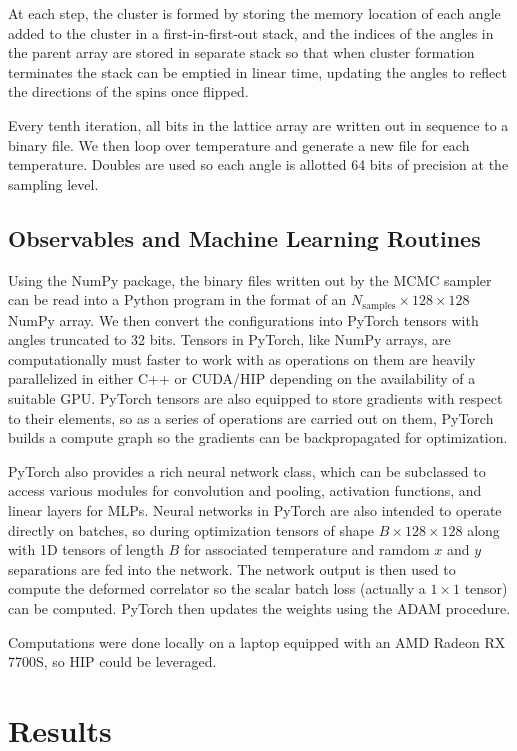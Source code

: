\documentclass[12pt]{article}
\begin{document}
At each step, the cluster is formed by storing the memory location of each angle added to the cluster in a first-in-first-out stack, and
the indices of the angles in the parent array are stored in separate stack so that when cluster formation terminates the stack can be
emptied in linear time, updating the angles to reflect the directions of the spins once flipped.

Every tenth iteration, all bits in the lattice array are written out in sequence to a binary file. We then loop over temperature
and generate a new file for each temperature. Doubles are used so each angle is allotted 64 bits of precision at the sampling level.

\subsection{Observables and Machine Learning Routines}

Using the NumPy package, the binary files written out by the MCMC sampler can be read into a Python program in the format of an $N_\mathrm{samples}\times 128 \times 128$ NumPy array.
We then convert the configurations into PyTorch tensors with angles truncated to 32 bits. Tensors in PyTorch, like NumPy arrays, are computationally must faster to work with as operations on them
are heavily parallelized in either C++ or CUDA/HIP depending on the availability of a suitable GPU. PyTorch tensors are also equipped to store
gradients with respect to their elements, so as a series of operations are carried out on them, PyTorch builds a compute graph so the gradients can be backpropagated for optimization.

PyTorch also provides a rich neural network class, which can be subclassed to access various modules for convolution and pooling, activation functions,
and linear layers for MLPs. Neural networks in PyTorch are also intended to operate directly on batches, so during optimization tensors of shape $B\times 128 \times 128$
along with 1D tensors of length $B$ for associated temperature and ramdom $x$ and $y$ separations are fed into the network. The network output is then used to compute
the deformed correlator so the scalar batch loss (actually a $1\times1$ tensor) can be computed. PyTorch then updates the weights using the ADAM
procedure.

Computations were done locally on a laptop equipped with an AMD Radeon RX 7700S, so HIP could be leveraged.

\section{Results}
\end{document}
